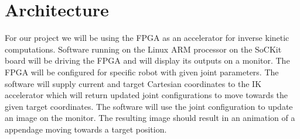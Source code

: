 \section{Architecture}
For our project we will be using the FPGA as an accelerator for
inverse kinetic computations. Software running on the Linux ARM processor 
on the SoCKit board will be driving the FPGA and will display its outputs on 
a monitor. The FPGA will be configured for specific robot with given joint 
parameters. The software will supply current and target Cartesian coordinates 
to the IK accelerator which will return updated joint configurations to 
move towards the given target coordinates. The software will use the 
joint configuration to update an image on the monitor. The resulting 
image should result in an animation of a appendage moving towards a target 
position.
